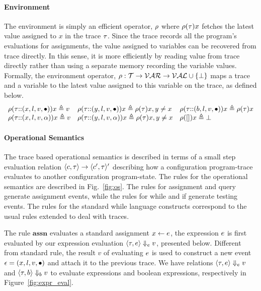 \paragraph{Environment}
The environment is simply an efficient operator, $\rho$ where $\rho(\mathtt{\tau}) x$ fetches the latest value assigned to $x$ in the trace $\mathtt{\tau}$.
  Since the trace records all the program's evaluations for assignments, 
  the value assigned to variables can be recovered from trace directly.
  In this sense, it is more efficiently by reading value from trace directly rather than using a separate memory recording the variable values.
Formally, the environment operator, $\rho : {\mathcal{T}}  \to \mathcal{VAR} \to \mathcal{VAL} \cup \{\bot\}$ maps a trace and a variable to the latest value assigned to this variable on the trace, as defined below.
\[
\begin{array}{lll}
\rho(\mathtt{\tau}  {\small ::} (x, l, v, \bullet)) x \triangleq v
&
\rho(\mathtt{\tau} {\small ::} (y, l, v, \bullet)) x \triangleq \rho(\mathtt{\tau}) x, y \neq x
&
\rho(\mathtt{\tau} {\small ::} (b, l, v, \bullet)) x \triangleq \rho(\mathtt{\tau}) x
\\
\rho(\mathtt{\tau} {\small ::} (x, l, v, \alpha)) x \triangleq v
&
\rho(\mathtt{\tau} {\small ::} (y, l, v, \alpha)) x \triangleq \rho(\mathtt{\tau}) x, y \neq x
&
\rho({[]} ) x \triangleq \bot
\end{array}
\]

 \paragraph*{Operational Semantics}
 The trace based operational semantics is described in terms of a small step evaluation relation
 $\langle c, \mathtt{\tau} \rangle \to \langle c', \mathtt{\tau} \rangle'$  describing how a configuration program-trace evaluates to another
 configuration program-state. 
 The rules for the operational semantics are described in Fig.~\ref{fig:os}.
 The rules for assignment and query generate assignment events, while the rules for while and if generate testing events. 
 The rules for the standard while language constructs correspond to the usual rules extended to deal with traces. 

The rule $\textbf{assn}$ evaluates a standard assignment $\mathrel{ x \leftarrow e }$, the expression $e$ is first evaluated by our expression evaluation $\langle \mathtt{\tau}, e \rangle \Downarrow_e v $, presented below.
{Different from standard rule, the result $v$ of evaluating $e$ is used to construct a new event $\mathtt{\epsilon} = (x, l, v,\bullet)$
and attach it to the previous trace. }
We have relations $\langle \mathtt{\tau}, e \rangle \Downarrow_e v $  and $\langle \mathtt{\tau}, b \rangle \Downarrow_b v $  to evaluate expressions and boolean expressions, respectively in Figure~\ref{fig:expr_eval}.

